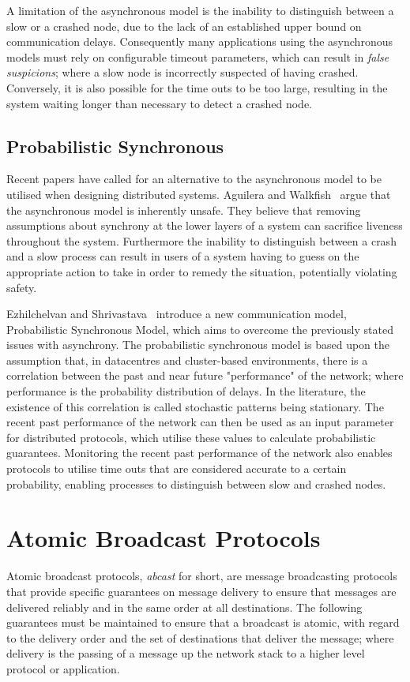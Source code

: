 	A limitation of the asynchronous model is the inability to distinguish between a slow or a crashed node, due to the lack of an established upper bound on communication delays.  Consequently many applications using the asynchronous models must rely on configurable timeout parameters, which can result in \emph{false suspicions}; where a slow node is incorrectly suspected of having crashed.  Conversely, it is also possible for the time outs to be too large, resulting in the system waiting longer than necessary to detect a crashed node.  
	
	\subsection{Probabilistic Synchronous}
	Recent papers have called for an alternative to the asynchronous model to be utilised when designing distributed systems. Aguilera and Walkfish~\cite{Aguilera:2009:NTA:1855568.1855571} argue that the asynchronous model is inherently unsafe. They believe that removing assumptions about synchrony at the lower layers of a system can sacrifice liveness throughout the system. Furthermore the inability to distinguish between a crash and a slow process can result in users of a system having to guess on the appropriate action to take in order to remedy the situation, potentially violating safety. 

Ezhilchelvan and Shrivastava~\cite{Ezhilchelvan:2010:LPR:1773912.1773927} introduce a new communication model, Probabilistic Synchronous Model, which aims to overcome the previously stated issues with asynchrony. The probabilistic synchronous model is based upon the assumption that, in datacentres and cluster-based environments, there is a correlation between the past and near future "performance" of the network; where performance is the probability distribution of delays. In the literature, the existence of this correlation is called stochastic patterns being stationary. The recent past performance of the network can then be used as an input parameter for distributed protocols, which utilise these values to calculate probabilistic guarantees. Monitoring the recent past performance of the network also enables protocols to utilise time outs that are considered accurate to a certain probability, enabling processes to distinguish between slow and crashed nodes. 


\section{Atomic Broadcast Protocols} \label{atomic_guarantees}
Atomic broadcast protocols, \emph{abcast} for short, are message broadcasting protocols that provide specific guarantees on message delivery to ensure that messages are delivered reliably and in the same order at all destinations.  The following guarantees must be maintained to ensure that a broadcast is atomic, with regard to the delivery order and the set of destinations that deliver the message; where delivery is the passing of a message up the network stack to a higher level protocol or application.  

